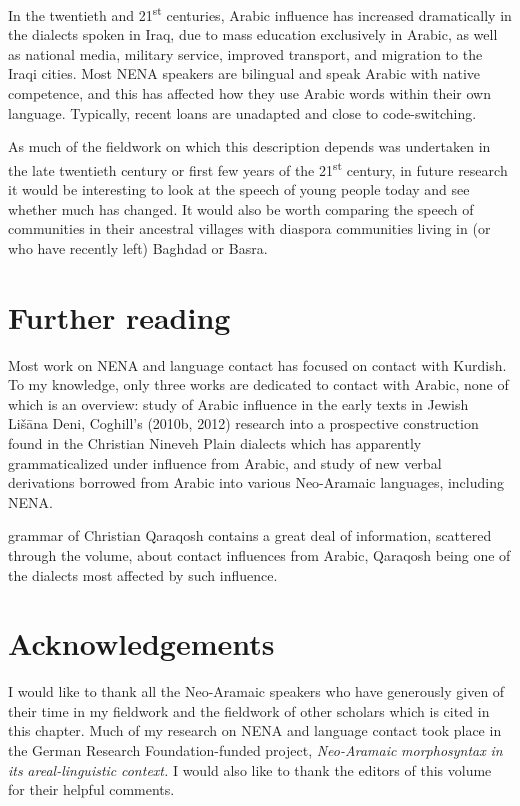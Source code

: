 \documentclass[output=paper]{langsci/langscibook}
\begin{document}
In the twentieth and 21\textsuperscript{st} centuries, Arabic influence has increased dramatically in the dialects spoken in Iraq, due to mass education exclusively in Arabic, as well as national media, military service, improved transport, and migration to the Iraqi cities. Most NENA speakers are bilingual and speak Arabic with native competence, and this has affected how they use Arabic words within their own language. Typically, recent loans are unadapted and close to code-switching.

As much of the fieldwork on which this description depends was undertaken in the late twentieth century or first few years of the 21\textsuperscript{st} century, in future research it would be interesting to look at the speech of young people today and see whether much has changed. It would also be worth comparing the speech of communities in their ancestral villages with diaspora communities living in (or who have recently left) Baghdad or Basra.

\section*{Further reading}

Most work on NENA and language contact has focused on contact with Kurdish. To my knowledge, only three works are dedicated to contact with Arabic, none of which is an overview:  study of Arabic influence in the early texts in Jewish Lišāna Deni, Coghill’s (2010b, 2012) research into a prospective construction found in the Christian Nineveh Plain dialects which has apparently grammaticalized under influence from Arabic, and  study of new verbal derivations borrowed from Arabic into various Neo-Aramaic languages, including NENA.

 grammar of Christian Qaraqosh contains a great deal of information, scattered through the volume, about contact influences from Arabic, Qaraqosh being one of the dialects most affected by such influence.

\section*{Acknowledgements}

I would like to thank all the Neo-Aramaic speakers who have generously given of their time in my fieldwork and the fieldwork of other scholars which is cited in this chapter. Much of my research on NENA and language contact took place in the German Research Foundation-funded project, \textit{Neo-Aramaic} \textit{morphosyntax} \textit{in} \textit{its} \textit{areal-linguistic} \textit{context.} I would also like to thank the editors of this volume for their helpful comments.
\end{document}
